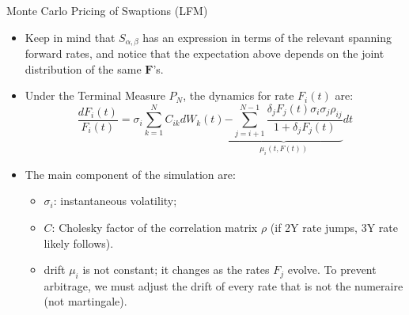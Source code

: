 \documentclass{beamer}
\begin{document}
\begin{frame}{Monte Carlo Pricing of Swaptions (LFM)}
	\begin{itemize}
		\item<1-> Keep in mind that $S_{\alpha,\beta}$ has an expression in terms of the relevant spanning forward rates, and notice that the expectation above depends on the joint distribution of the same $\bm{F}$’s.
		\item Under the Terminal Measure $P_N$, the dynamics for rate $F_i(t)$ are:
		\begin{equation*}
			\frac{dF_i(t)}{F_i(t)} =\sigma_i \sum_{k=1}^N C_{ik} dW_k(t) \underbrace{-\sum_{j=i+1}^{N-1} \frac{\delta_j F_j(t) \sigma_i \sigma_j \rho_{ij}}{1 + \delta_j F_j(t)}}_{\mu_i(t, F(t))}dt
		\end{equation*}
		\item The main component of the simulation are:
		\begin{itemize}
			\item $\sigma_i$: instantaneous volatility;
			\item $C$: Cholesky factor of the correlation matrix $\rho$ (if 2Y rate jumps, 3Y rate likely follows).
			\item drift $\mu_i$ is not constant; it changes as the rates $F_j$ evolve. To prevent arbitrage, we must adjust the drift of every rate that is not the numeraire (not martingale).
		\end{itemize}
	\end{itemize}
\end{frame}
\end{document}
